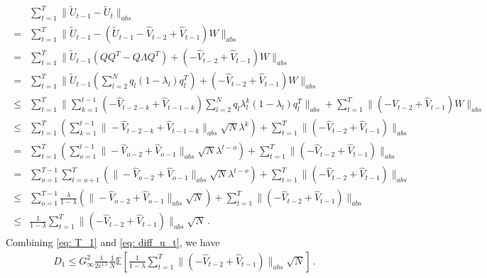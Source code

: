 \documentclass[11pt]{article}
\begin{document}
\begin{align}\label{eq: diff_u_t}
\begin{split}
& \sum_{t=1}^T   \|{{\tilde U_{t-1}}} - {{\tilde U_{t}}\|_{abs}}  \\
= &       \sum_{t=1}^T   \|{{\tilde U_{t-1}}} - (\tilde U_{t-1}  - \hat V_{t-2} + \hat V_{t-1})W \|_{abs}      \\
= &   \sum_{t=1}^T   \|\tilde U_{t-1}(QQ^T-Q\Lambda Q^T)  + (- \hat V_{t-2} + \hat V_{t-1})W \|_{abs}   \\
= &  \sum_{t=1}^T   \|\tilde U_{t-1}(\sum_{l=2}^N q_l (1-\lambda_l)q_l^T)  + (- \hat V_{t-2} + \hat V_{t-1})W\|_{abs}     \\
\leq &  \sum_{t=1}^T   \| \sum_{k=1}^{t-1} (- \hat V_{t-2-k} + \hat V_{t-1-k} ) \sum_{l=2}^N q_l \lambda_l^k  (1-\lambda_l)q_l^T  \|_{abs} + \sum_{t=1}^T  \| (- \hat V_{t-2} + \hat V_{t-1})W \|_{abs}      \\
\leq &   \sum_{t=1}^T  \left(  \sum_{k=1}^{t-1} \|- \hat V_{t-2-k} + \hat V_{t-1-k}\|_{abs} \sqrt{N}\lambda^k \right)   + \sum_{t=1}^T  \| ( - \hat V_{t-2} + \hat V_{t-1}) \|_{abs}   \\
=  &  \sum_{t=1}^T  \left(  \sum_{o=1}^{t-1} \|- \hat V_{o-2} + \hat V_{o-1}\|_{abs} \sqrt{N}\lambda^{t-o} \right)   + \sum_{t=1}^T  \| ( - \hat V_{t-2} + \hat V_{t-1}) \|_{abs}      \\
=  &\sum_{o=1}^{T-1}  \sum_{t=o+1}^T  \left(   \|- \hat V_{o-2} + \hat V_{o-1}\|_{abs} \sqrt{N}\lambda^{t-o} \right)   + \sum_{t=1}^T  \| ( - \hat V_{t-2} + \hat V_{t-1}) \|_{abs}    \\
\leq &\sum_{o=1}^{T-1} \frac{\lambda}{1-\lambda}   \left(   \|- \hat V_{o-2} + \hat V_{o-1}\|_{abs} \sqrt{N}  \right)   + \sum_{t=1}^T  \| ( - \hat V_{t-2} + \hat V_{t-1}) \|_{abs}    \\
\leq & \frac{1}{1-\lambda}   \sum_{t=1}^T  \| ( - \hat V_{t-2} + \hat V_{t-1}) \|_{abs}  \sqrt{N}    \, .
\end{split}
\end{align}
Combining \eqref{eq: T_1} and \eqref{eq: diff_u_t}, we have
\begin{align}
D_1 \leq G_{\infty}^2 \frac{1}{2\epsilon^{1.5}} \frac{1}{N}   \mathbb E \left [  \frac{1}{1-\lambda}   \sum_{t=1}^T  \| ( - \hat V_{t-2} + \hat V_{t-1}) \|_{abs}  \sqrt{N} \right]\, .
\end{align}
\end{document}
